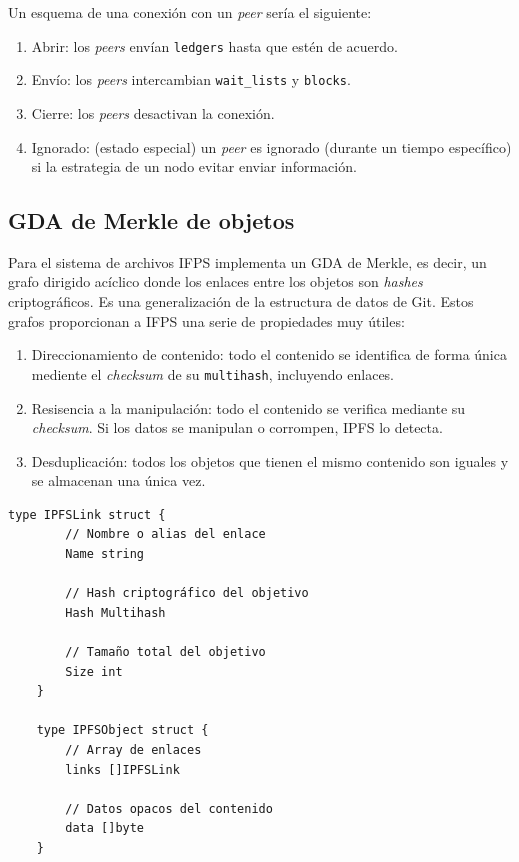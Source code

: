 \documentclass[12pt]{article} %
\begin{document}
Un esquema de una conexión con un \textit{peer} sería el siguiente:
\begin{enumerate}
	\item Abrir: los \textit{peers} envían \texttt{ledgers} hasta que estén de acuerdo.
	\item Envío: los \textit{peers} intercambian \texttt{wait\_lists} y \texttt{blocks}.
	\item Cierre: los \textit{peers} desactivan la conexión.
	\item Ignorado: (estado especial) un \textit{peer} es ignorado (durante un tiempo específico) si la estrategia de un nodo evitar enviar información.
\end{enumerate}




\subsection{GDA de Merkle de objetos} %
\label{sub:grafo_dirigido_acíclico_de_merkle_de_objetos}

Para el sistema de archivos IFPS implementa un GDA de Merkle, es decir, un grafo dirigido acíclico donde los enlaces entre los objetos son \textit{hashes} criptográficos. Es una generalización de la estructura de datos de Git. Estos grafos proporcionan a IFPS una serie de propiedades muy útiles:
\begin{enumerate}
	\item Direccionamiento de contenido: todo el contenido se identifica de forma única mediente el \textit{checksum} de su \texttt{multihash}, incluyendo enlaces.
	\item Resisencia a la manipulación: todo el contenido se verifica mediante su \textit{checksum}. Si los datos se manipulan o corrompen, IPFS lo detecta.
	\item Desduplicación: todos los objetos que tienen el mismo contenido son iguales y se almacenan una única vez.
\end{enumerate}

\begin{lstlisting}[caption={Implementación de los objetos IPFS.}, language=Golang]
	type IPFSLink struct {
		// Nombre o alias del enlace
		Name string

		// Hash criptográfico del objetivo
		Hash Multihash

		// Tamaño total del objetivo
		Size int
	}

	type IPFSObject struct {
		// Array de enlaces
		links []IPFSLink

		// Datos opacos del contenido
		data []byte
	}
\end{lstlisting}
\end{document}
